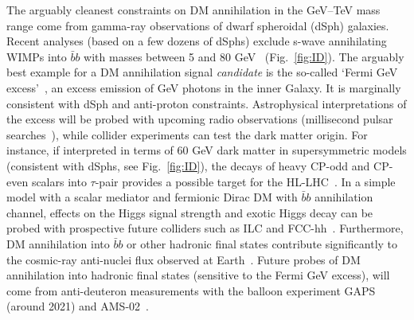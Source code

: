 \documentclass[../report.tex]{subfiles}
\begin{document}
The arguably cleanest constraints on DM annihilation in the GeV--TeV mass range come from gamma-ray observations of dwarf spheroidal (dSph) galaxies. Recent analyses (based on a few dozens of dSphs) exclude s-wave annihilating WIMPs into $\bar b b$ with masses between 5 and 80 GeV~\cite{Albert2017-hn} (Fig.~\ref{fig:ID}).  The arguably best example for a DM annihilation signal \emph{candidate} is the so-called `Fermi GeV excess'~\cite{Ackermann2017-gy}, an excess emission of GeV photons in the inner Galaxy.  It is marginally consistent with dSph and anti-proton constraints.  Astrophysical interpretations of the excess will be probed with upcoming radio observations (millisecond pulsar searches~\cite{Calore:2015bsx}), while collider experiments can test the dark matter origin.  For instance, if interpreted in terms of 60 GeV dark matter in supersymmetric models (consistent with dSphs, see Fig.~\ref{fig:ID}), the decays of heavy CP-odd and CP-even scalars into $\tau$-pair provides a possible target for the HL-LHC~\cite{Carena:2019pwq}.  In a simple model with a scalar mediator and fermionic Dirac DM with $\bar bb$ annihilation channel, effects on the Higgs signal strength and exotic Higgs decay can be probed with prospective future colliders such as  ILC and FCC-hh~\cite{Kim2018-yk}.  Furthermore, DM annihilation into $\bar bb$ or other hadronic final states contribute significantly to the cosmic-ray anti-nuclei flux observed at Earth~\cite{Giesen:2015ufa}. Future probes of DM annihilation into hadronic final states (sensitive to the Fermi GeV excess), will come from anti-deuteron measurements with the balloon experiment GAPS (around 2021) and AMS-02~\cite{Aramaki2016-to}.
\end{document}
